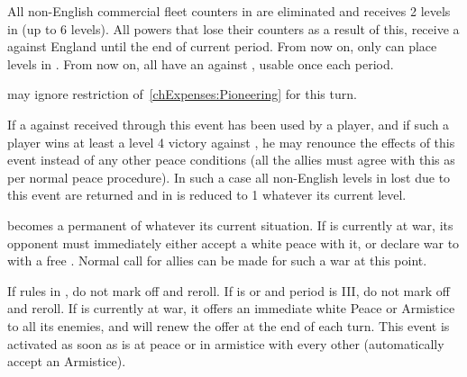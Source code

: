 \phevnt
\aparag All non-English commercial fleet counters in  are
eliminated and \ENG receives 2 \TradeFLEET levels in  (up to 6
levels). All powers that lose their counters as a result of this, receive a
\CB against England until the end of current period.
\aparag From now on, only \ENG can place \TradeFLEET levels in
.
\aparag From now on, all \MAJ have an \OCB against \ENG, usable once each
period.

\phadm
\aparag \ENG may ignore restriction of~\ref{chExpenses:Pioneering} for this
turn.

\phpaix
\aparag If a \CB against \ENG received through this event has been used by a
player, and if such a player wins at least a level 4 victory against \ENG, he
may renounce the effects of this event instead of any other peace conditions
(all the allies must agree with this as per normal peace procedure).
\aparag In such a case all non-English \TradeFLEET levels in 
lost due to this event are returned and \ENG \TradeFLEET in 
is reduced to 1 whatever its current level.






\phevnt
\aparag \paysecosse becomes a permanent \VASSAL of \ENG whatever its current
situation.
\aparag If \paysecosse is currently at war, its opponent must immediately
either accept a white peace with it, or declare war to \ENG with a free \CB.
Normal call for allies can be made for such a war at this point.





\condition{}
\aparag If  rules in \ENG, do not mark off and reroll.
\aparag If \ENG is \CATHCR or \CATHCO and period is III, do not mark off and
reroll.
\aparag If \ENG is currently at war, it offers an immediate white Peace or
Armistice to all its enemies, and will renew the offer at the end of each
turn.
\bparag This event is activated as soon as \ENG is at peace or in armistice
with every other \MAJ (\MIN automatically accept an Armistice).

